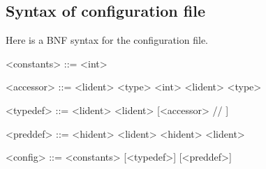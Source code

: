 \documentclass[10pt,a4paper]{article}
\begin{document}
\subsection{Syntax of configuration file}
\label{subsec:syntaxconfig} Here is a BNF syntax for the configuration file.
\begin{grammar}
  <constants> ::=
    \lit{=} <int>

  <accessor> ::=
  <lident>  <type>
  \alt <int> <lident>  <type>

  <typedef> ::=
   <lident>
  \alt {} <lident> \lit{=} [<accessor> // \lit{|}]

  <preddef> ::=
   <hident>  <lident>
  \alt {} <hident>  <lident>

  <config> ::=
  <constants> [<typedef>] [<preddef>]
\end{grammar}



\end{document}
